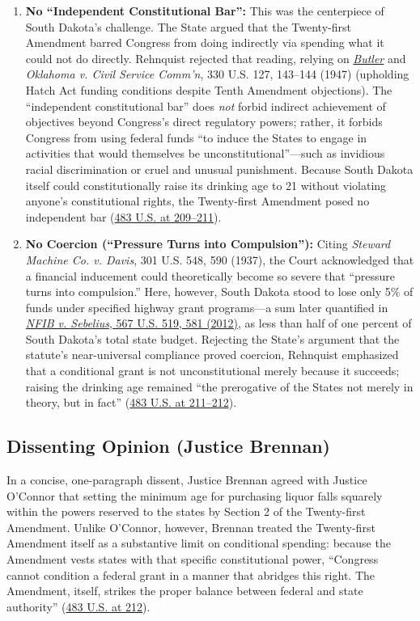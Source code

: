 \documentclass[12pt]{article}
\begin{document}
\begin{enumerate}
  \item \textbf{No ``Independent Constitutional Bar'':} This was the centerpiece of South Dakota's challenge. The State argued that the Twenty-first Amendment barred Congress from doing indirectly via spending what it could not do directly. Rehnquist rejected that reading, relying on \href{https://supreme.justia.com/cases/federal/us/297/1/}{\textit{Butler}} and \textit{Oklahoma v. Civil Service Comm'n}, 330 U.S. 127, 143--144 (1947) (upholding Hatch Act funding conditions despite Tenth Amendment objections). The ``independent constitutional bar'' does \textit{not} forbid indirect achievement of objectives beyond Congress's direct regulatory powers; rather, it forbids Congress from using federal funds ``to induce the States to engage in activities that would themselves be unconstitutional''---such as invidious racial discrimination or cruel and unusual punishment. Because South Dakota itself could constitutionally raise its drinking age to 21 without violating anyone's constitutional rights, the Twenty-first Amendment posed no independent bar (\href{https://supreme.justia.com/cases/federal/us/483/203/}{483 U.S. at 209--211}).
  \item \textbf{No Coercion (``Pressure Turns into Compulsion''):} Citing \textit{Steward Machine Co. v. Davis}, 301 U.S. 548, 590 (1937), the Court acknowledged that a financial inducement could theoretically become so severe that ``pressure turns into compulsion.'' Here, however, South Dakota stood to lose only 5\% of funds under specified highway grant programs---a sum later quantified in \href{https://supreme.justia.com/cases/federal/us/567/519/}{\textit{NFIB v. Sebelius}, 567 U.S. 519, 581 (2012)}, as less than half of one percent of South Dakota's total state budget. Rejecting the State's argument that the statute's near-universal compliance proved coercion, Rehnquist emphasized that a conditional grant is not unconstitutional merely because it succeeds; raising the drinking age remained ``the prerogative of the States not merely in theory, but in fact'' (\href{https://supreme.justia.com/cases/federal/us/483/203/}{483 U.S. at 211--212}).
\end{enumerate}

\subsection{Dissenting Opinion (Justice Brennan)}

In a concise, one-paragraph dissent, Justice Brennan agreed with Justice O'Connor that setting the minimum age for purchasing liquor falls squarely within the powers reserved to the states by Section 2 of the Twenty-first Amendment. Unlike O'Connor, however, Brennan treated the Twenty-first Amendment itself as a substantive limit on conditional spending: because the Amendment vests states with that specific constitutional power, ``Congress cannot condition a federal grant in a manner that abridges this right. The Amendment, itself, strikes the proper balance between federal and state authority'' (\href{https://supreme.justia.com/cases/federal/us/483/203/}{483 U.S. at 212}).
\end{document}
